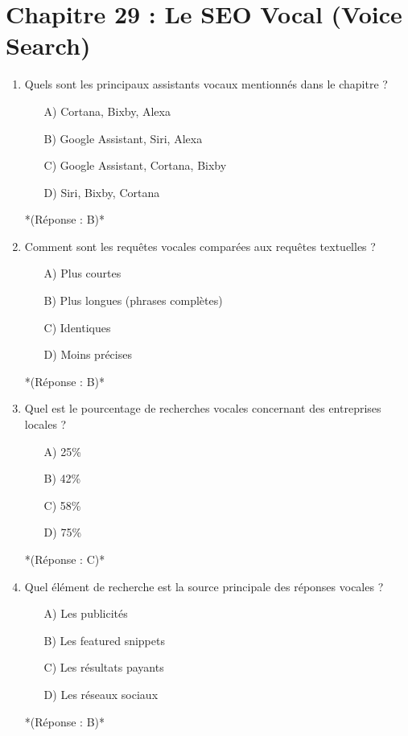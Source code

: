 \documentclass[12pt,a4paper,twoside]{report}
\begin{document}
\section*{Chapitre 29 : Le SEO Vocal (Voice Search)}
\begin{enumerate}
    \item Quels sont les principaux assistants vocaux mentionnés dans le chapitre ?
    \begin{itemize}
        \item[A)] Cortana, Bixby, Alexa
        \item[B)] Google Assistant, Siri, Alexa
        \item[C)] Google Assistant, Cortana, Bixby
        \item[D)] Siri, Bixby, Cortana
    \end{itemize}
    *(Réponse : B)*

    \item Comment sont les requêtes vocales comparées aux requêtes textuelles ?
    \begin{itemize}
        \item[A)] Plus courtes
        \item[B)] Plus longues (phrases complètes)
        \item[C)] Identiques
        \item[D)] Moins précises
    \end{itemize}
    *(Réponse : B)*

    \item Quel est le pourcentage de recherches vocales concernant des entreprises locales ?
    \begin{itemize}
        \item[A)] 25\%
        \item[B)] 42\%
        \item[C)] 58\%
        \item[D)] 75\%
    \end{itemize}
    *(Réponse : C)*

    \item Quel élément de recherche est la source principale des réponses vocales ?
    \begin{itemize}
        \item[A)] Les publicités
        \item[B)] Les featured snippets
        \item[C)] Les résultats payants
        \item[D)] Les réseaux sociaux
    \end{itemize}
    *(Réponse : B)*


\end{enumerate}
\end{document}

